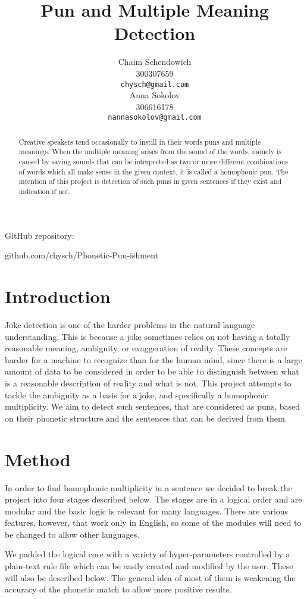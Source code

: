\documentclass[11pt,a4paper]{article}
\title{Pun and Multiple Meaning Detection}
\author{Chaim Schendowich \\
  300307659 \\
  {\tt chysch@gmail.com} \\\And
  Anna Sokolov \\
  306616178 \\
  {\tt nannasokolov@gmail.com} \\}
\date{}
\begin{document}
\maketitle
\small{
GitHub repository:

github.com/chysch/Phonetic-Pun-ishment}

\hfill

\begin{abstract}
Creative speakers tend occasionally to instill in their words puns and multiple meanings. When the multiple meaning arises from the sound of the words, namely is caused by saying sounds that can be interpreted as two or more different combinations of words which all make sense in the given context, it is called a homophonic pun. The intention of this project is detection of such puns in given sentences if they exist and indication if not.
\end{abstract}

\section{Introduction}

Joke detection is one of the harder problems in the natural language understanding. This is because a joke sometimes relies on not having a totally reasonable meaning, ambiguity, or exaggeration of reality. These concepts are harder for a machine to recognize than for the human mind, since there is a large amount of data to be considered in order to be able to distinguish between what is a reasonable description of reality and what is not. This project attempts to tackle the ambiguity as a basis for a joke, and specifically a homophonic multiplicity. We aim to detect such sentences, that are considered as puns, based on their phonetic structure and the sentences that can be derived from them.

\section{Method}

In order to find homophonic multiplicity in a sentence we decided to break the project into four stages described below. The stages are in a logical order and are modular and the basic logic is relevant for many languages. There are various features, however, that work only in English, so some of the modules will need to be changed to allow other languages.

We padded the logical core with a variety of hyper-parameters controlled by a plain-text rule file which can be easily created and modified by the user. These will also be described below. The general idea of most of them is weakening the accuracy of the phonetic match to allow more positive results.
\end{document}
